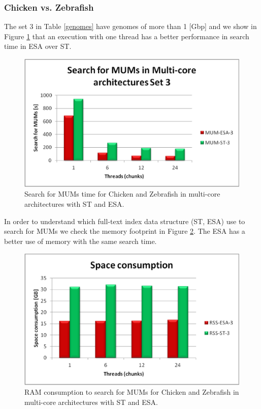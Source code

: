 \documentclass[runningheads,a5paper]{llncs}
\begin{document}
\subsubsection{Chicken vs. Zebrafish}
The set 3 in Table \ref{genomes} have genomes of more than 1 [Gbp] and we show in Figure \ref{fig:chicken-mum} that an execution with one thread has a better performance in search time in ESA over ST. 
 \begin{figure}[!h]
  \centering
  \includegraphics[scale=0.3]{chicken-MUM.eps}
  \caption{Search for MUMs time for Chicken and Zebrafish in multi-core architectures with ST and ESA.}
  \label{fig:chicken-mum}
\end{figure}  
In order to understand which full-text index data structure (ST, ESA) use to search for MUMs we check the memory footprint in Figure \ref{fig:chicken-ram}. The ESA has a better use of memory with the same search time.
 \begin{figure}[!h]
  \centering
  \includegraphics[scale=0.3]{chicken-RAM.eps}
  \caption{RAM consumption to search for MUMs for Chicken and Zebrafish in multi-core architectures with ST and ESA.}
  \label{fig:chicken-ram}
\end{figure}  
\end{document}
